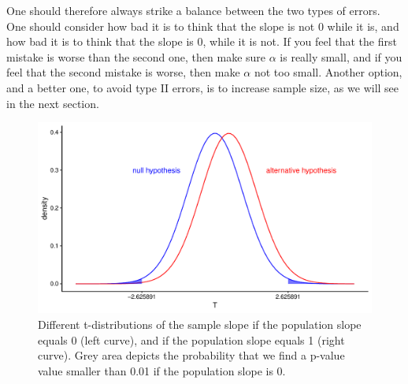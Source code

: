 \documentclass[]{book}\usepackage[]{graphicx}\usepackage[]{color}
\makeatletter
\def\maxwidth{ %
  \ifdim\Gin@nat@width>\linewidth
    \linewidth
  \else
    \Gin@nat@width
  \fi
}
\newenvironment{knitrout}{}{} %
\makeatother
\begin{document}
One should therefore always strike a balance between the two types of errors. One should consider how bad it is to think that the slope is not 0 while it is, and how bad it is to think that the slope is 0, while it is not. If you feel that the first mistake is worse than the second one, then make sure $\alpha$ is really small, and if you feel that the second mistake is worse, then make $\alpha$ not too small. Another option, and a better one, to avoid type II errors, is to increase sample size, as we will see in the next section.

\begin{knitrout}
\color{fgcolor}\begin{figure}

{\centering \includegraphics[width=\maxwidth]{figure/inf_22-1} 

}

\caption[Different t-distributions of the sample slope if the population slope equals 0 (left curve), and if the population slope equals 1 (right curve)]{Different t-distributions of the sample slope if the population slope equals 0 (left curve), and if the population slope equals 1 (right curve). Grey area depicts the probability that we find a p-value value smaller than 0.01 if the population slope is 0.}\label{fig:inf_22}
\end{figure}


\end{knitrout}
\end{document}
